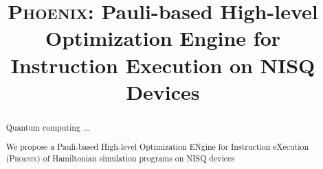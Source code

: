 \documentclass[conference]{IEEEtran}
\newcommand{\phoenix}{\textsc{Phoenix}}
\begin{document}

\title{\phoenix: Pauli-based High-level Optimization Engine for Instruction Execution on NISQ Devices}






    






\maketitle


\begin{abstract}
    Quantum computing ...

    We propose a Pauli-based High-level Optimization ENgine for Instruction eXecution (\phoenix) of Hamiltonian simulation programs on NISQ devices

    
    
\end{abstract}

\end{document}
